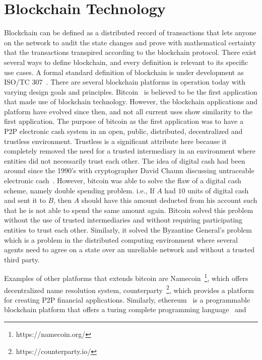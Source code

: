 \section{Blockchain Technology} \label{sec:blockchain}
Blockchain can be defined as a distributed record of transactions that lets
anyone on the network to audit the state changes and prove with mathematical
certainty that the transactions transpired according to the blockchain
protocol. There exist several ways to define blockchain, and every definition
is relevant to its specific use cases. A formal standard definition of
blockchain is under development as ISO/TC 307~\cite{ISOTC307}. There are
several blockchain platforms in operation today with varying design goals and
principles. Bitcoin~\cite{Bitcoin_Satoshi} is believed to be the first
application that made use of blockchain technology. However, the blockchain
applications and platform have evolved since then, and not all current uses
show similarity to the first application. The purpose of bitcoin as the first
application was to have a P2P electronic cash system in an open, public,
distributed, decentralized and trustless environment. Trustless is a
significant attribute here because it completely removed the need for a trusted
intermediary in an environment where entities did not necessarily trust each
other. The idea of digital cash had been around since the 1990's with
cryptographer David Chaum discussing untraceable electronic
cash~\cite{chaum1988untraceable}. However, bitcoin was able to solve the flaw
of a digital cash scheme, namely double spending problem. i.e., If $A$ had $10$
units of digital cash and sent it to $B$, then $A$ should have this amount
deducted from his account such that he is not able to spend the same amount
again. Bitcoin solved this problem without the use of trusted intermediaries
and without requiring participating entities to trust each other. Similarly, it
solved the Byzantine General's problem which is a problem in the distributed
computing environment where several agents need to agree on a state over an
unreliable network and without a trusted third party. \par
Examples of other platforms that extends bitcoin are
Namecoin~\footnote{https://namecoin.org/}, which offers decentralized name resolution system, counterparty~\footnote{https://counterparty.io/}, which provides a platform for creating P2P financial applications. Similarly,
ethereum~\cite{buterin2013ethereum} is a programmable blockchain platform that
offers a turing complete programming language~\cite{dannen2017introducing} and
